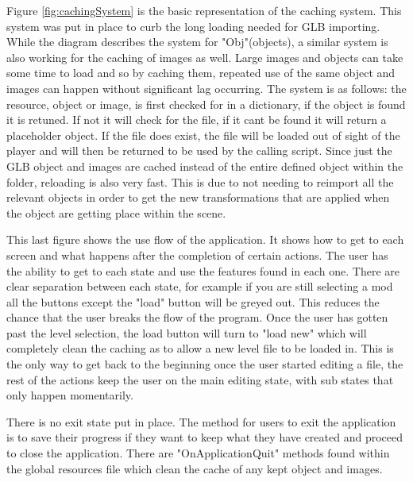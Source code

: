 Figure \ref{fig:cachingSystem} is the basic representation of the caching system. This system was put in place to curb the long loading needed for GLB importing. While the diagram describes the system for "Obj"(objects), a similar system is also working for the caching of images as well. Large images and objects can take some time to load and so by caching them, repeated use of the same object and images can happen without significant lag occurring.
The system is as follows: the resource, object or image, is first checked for in a dictionary, if the object is found it is retuned. If not it will check for the file, if it cant be found it will return a placeholder object. If the file does exist, the file will be loaded out of sight of the player and will then be returned to be used by the calling script. 
Since just the GLB object and images are cached instead of the entire defined object within the folder, reloading is also very fast. This is due to not needing to reimport all the relevant objects in order to get the new transformations that are applied when the object are getting place within the scene.

This last figure  shows the use flow of the application. It shows how to get to each screen and what happens after the completion of certain actions. The user has the ability to get to each state and use the features found in each one. There are clear separation between each state, for example if you are still selecting a mod  all the buttons except the "load" button will be greyed out. This reduces the chance that the user breaks the flow of the program. Once the user has gotten past the level selection, the load button will turn to "load new" which will completely clean the caching as to allow a new level file to be loaded in. This is the only way to get back to the beginning once the user started editing a file, the rest of the actions keep the user on the main editing state, with sub states that only happen momentarily.

There is no exit state put in place. The method for users to exit the application is to save their progress if they want to keep what they have created and proceed to close the application. There are "OnApplicationQuit" methods found within the global resources file which clean the cache of any kept object and images. 


